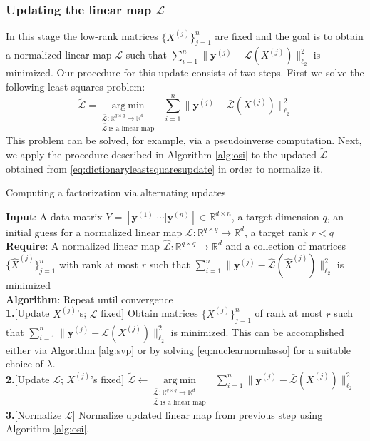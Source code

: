 \documentclass[11pt,letterpaper]{article}
\newcommand{\R}{\mathbb{R}}
\newcommand{\by}{\mathbf{y}}
\renewcommand{\L}{\mathcal{L}}
\newcommand{\argmin}{\mathrm{arg~min}}
\begin{document}
\subsubsection{Updating the linear map $\L$}
In this stage the low-rank matrices $\{X^{(j)}\}_{j=1}^n$ are fixed and the goal is to obtain a normalized linear map $\L$ such that $\sum_{i=1}^n \|\by^{(j)} - \L(X^{(j)})\|_{\ell_2}^2$ is minimized.  Our procedure for this update consists of two steps.  First we solve the following least-squares problem:
\begin{equation} \label{eq:dictionaryleastsquaresupdate}
\tilde{\L} = \underset{\substack{\bar{\L} : \R^{q \times q} \rightarrow \R^d \\ \bar{\L}~\text{is a linear map}}}{\argmin} ~~~ \sum_{i=1}^n \|\by^{(j)} - \bar{\L}(X^{(j)})\|_{\ell_2}^2
\end{equation}
This problem can be solved, for example, via a pseudoinverse computation.  Next, we apply the procedure described in Algorithm \ref{alg:osi} to the updated $\tilde{\L}$ obtained from \eqref{eq:dictionaryleastsquaresupdate} in order to normalize it.

\begin{algorithm}[t] 
    \caption{Computing a factorization via alternating updates}
    \label{alg:amsdpreg}
    \textbf{Input}: A data matrix $Y = [\by^{(1)} | \cdots | \by^{(n)}] \in \R^{d \times n}$, a target dimension $q$, an initial guess for a normalized linear map $\L: \R^{q \times q} \rightarrow \R^d$, a target rank $r < q$ \\
    \textbf{Require}: A normalized linear map $\hat{\L} : \R^{q \times q} \rightarrow \R^d$ and a collection of matrices $\{\hat{X}^{(j)}\}_{j=1}^n$ with rank at most $r$ such that $\sum_{i=1}^n \|\by^{(j)} - \hat{\L}(\hat{X}^{(j)})\|_{\ell_2}^2$ is minimized \\
    \textbf{Algorithm}: Repeat until convergence \\
    \textbf{1.}[Update $X^{(j)}$'s; $\L$ fixed] Obtain matrices $\{X^{(j)}\}_{j=1}^n$ of rank at most $r$ such that $\sum_{i=1}^n \|\by^{(j)} - \L(X^{(j)})\|_{\ell_2}^2$ is minimized.  This can be accomplished either via Algorithm \ref{alg:svp} or by solving \eqref{eq:nuclearnormlasso} for a suitable choice of $\lambda$. \\
    \textbf{2.}[Update $\L$; $X^{(j)}$'s fixed] $\tilde{\L} \leftarrow \underset{\substack{\bar{\L} : \R^{q \times q} \rightarrow \R^d \\ \bar{\L}~\text{is a linear map}}}{\argmin} ~~~ \sum_{i=1}^n \|\by^{(j)} - \bar{\L}(X^{(j)})\|_{\ell_2}^2$ \\
    \textbf{3.}[Normalize $\L$] Normalize updated linear map from previous step using Algorithm \ref{alg:osi}.

\end{algorithm}
\end{document}
